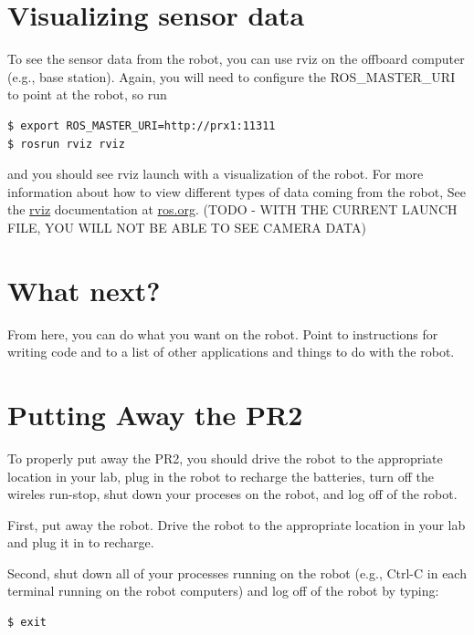 \section{Visualizing sensor data}
To see the sensor data from the robot, you can use rviz on the offboard computer (e.g., base station).  Again, you will 
need to configure the ROS\_MASTER\_URI to point at the robot, so run
\begin{verbatim}
$ export ROS_MASTER_URI=http://prx1:11311
$ rosrun rviz rviz
\end{verbatim}
and you should see rviz launch with a visualization of the robot.  For more information about how to view different types 
of data coming from the robot, See the \href{http://ros.org/wiki/rviz}{rviz} documentation at 
\href{http://www.ros.org}{ros.org}.
(TODO - WITH THE CURRENT LAUNCH FILE, YOU WILL NOT BE ABLE TO SEE CAMERA DATA)

\section{What next?}
From here, you can do what you want on the robot.  Point to instructions for writing code and to a list of other 
applications and things to do with the robot.

\section{Putting Away the PR2}
To properly put away the PR2, you should drive the robot to the appropriate location in your lab, plug in the robot to recharge the batteries, turn off the wireles run-stop, shut down your proceses on the robot, and log off of the robot.

First, put away the robot. Drive the robot to the appropriate location in your lab and plug it in to recharge.

Second, shut down all of your processes running on the robot (e.g., Ctrl-C in each terminal running on the robot computers) and log off of the robot by typing:
\begin{verbatim}
$ exit
\end{verbatim}
